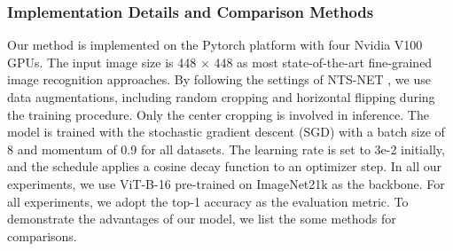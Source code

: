 \documentclass[5p,twocolumn]{elsarticle}
\begin{document}
\begin{table}[h]
\centering
  \caption{Fine-grained image dataset statistics.}
  \label{tab:dataset}
\end{table}

\subsubsection{\textbf{Implementation Details and Comparison Methods}}
Our method is implemented on the Pytorch platform with four Nvidia V100 GPUs.
The input image size is 448 $\times$ 448 as most state-of-the-art fine-grained image recognition approaches. By following the settings of NTS-NET \cite{Yang2018Learning}, we use data augmentations, including random cropping and horizontal flipping during the training procedure. Only the center cropping is involved in inference. The model is trained with the stochastic gradient descent (SGD) with a batch size of 8 and momentum of 0.9 for all datasets. The learning rate is set to 3e-2 initially, and the schedule applies a cosine decay function to an optimizer step.
In all our experiments, we use ViT-B-16 pre-trained on ImageNet21k as the backbone. For all experiments, we adopt the top-1 accuracy as the evaluation metric.
To demonstrate the advantages of our model, we list the some methods for comparisons.
\end{document}

